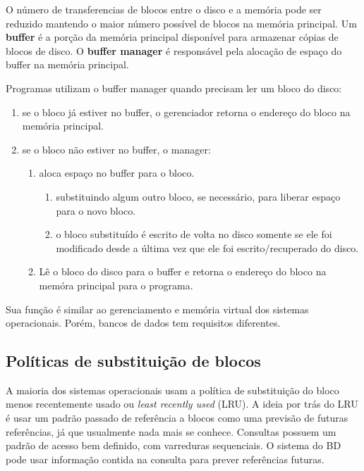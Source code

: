 O  número de transferencias de blocos entre o disco e a memória pode ser
reduzido mantendo o maior número possível de blocos na memória principal.
Um \textbf{buffer} é a porção da memória principal disponível para armazenar cópias
de blocos de disco.
O \textbf{buffer manager} é responsável pela alocação de espaço do buffer na 
memória principal.

Programas utilizam o buffer manager quando precisam ler um bloco do disco:
\begin{enumerate}
\item se o bloco já estiver no buffer, o gerenciador retorna o endereço 
do bloco na memória principal.

\item se o bloco não estiver no buffer, o manager:
	\begin{enumerate}
	\item aloca espaço no buffer para o bloco.
		\begin{enumerate}
		\item substituindo algum outro bloco, se necessário, para
			liberar espaço para o novo bloco.
		\item o bloco substituído é escrito de volta no disco somente se ele foi
		modificado desde a última vez que ele foi escrito/recuperado do disco.
		\end{enumerate}
	\item Lê o bloco do disco para o buffer e retorna o endereço do bloco
		na memóra principal para o programa.
	\end{enumerate}
\end{enumerate}

Sua função é similar ao gerenciamento e memória virtual dos sistemas operacionais.
Porém, bancos de dados tem requisitos diferentes.

\subsection{Políticas de substituição de blocos}

A maioria dos sistemas operacionais usam a política de substituição do bloco menos recentemente usado
ou \emph{least recently used} (LRU).
A ideia por trás do LRU é usar um padrão passado de referência a blocos como uma previsão de 
futuras referências, já que usualmente nada mais se conhece.
Consultas possuem um padrão de acesso bem definido, com varreduras sequenciais.
O sistema do BD pode usar informação contida na consulta para prever referências futuras.

